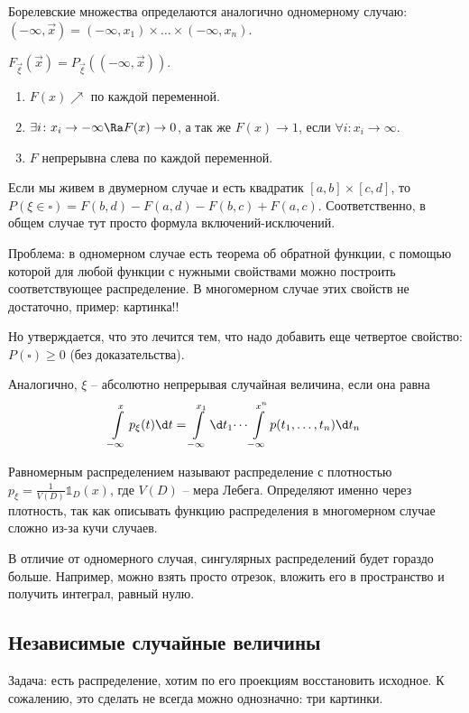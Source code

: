 Борелевские множества определаются аналогично одномерному случаю: $(-\infty, \vec{x}) = (-\infty, x_1) \times \dots \times (-\infty, x_n)$.

$F_{\vec{\xi}}(\vec{x}) = P_{\vec{\xi}}((-\infty, \vec{x}))$.

\begin{theorem}

\begin{enumerate}

\item $F(x) \nearrow$ по каждой переменной.
\item $\exists i\colon x_i \to -\infty \Ra F(x) \to 0$, а так же $F(x) \to 1$, если $\forall i\colon x_i \to \infty$.
\item $F$ непрерывна слева по каждой переменной.
\end{enumerate}
\end{theorem}

Если мы живем в двумерном случае и есть квадратик $[a, b] \times [c, d]$, то $P(\xi \in \square)= F(b, d) - F(a, d) - F(b, c) + F(a, c)$. 
Соответственно, в общем случае тут просто формула включений-исключений.

Проблема: в одномерном случае есть теорема об обратной функции, с помощью которой для любой функции с нужными свойствами можно построить соответствующее распределение.
В многомерном случае этих свойств не достаточно, пример: \TODO картинка!!

Но утверждается, что это лечится тем, что надо добавить еще четвертое свойство: $P(\square) \geq 0$ (без доказательства). 

Аналогично, $\xi$ -- абсолютно непрерывая случайная величина, если она равна 
$$\int\limits_{-\infty}^x p_{\xi}(t)\d t = \int\limits_{-\infty}^{x_1} \d t_1 \dots \int\limits_{-\infty}^{x^n} p(t_1, \dots, t_n) \d t_n$$

Равномерным распределением называют распределение с плотностью $p_{\xi} = \frac{1}{V(D)} \mathbb{1}_D(x)$, где $V(D)$ -- мера Лебега.
Определяют именно через плотность, так как описывать функцию распределения в многомерном случае сложно из-за кучи случаев.

В отличие от одномерного случая, сингулярных распределений будет гораздо больше. Например, можно взять просто отрезок, вложить его в пространство и получить интеграл, равный нулю.


\subsection{Независимые случайные величины}
Задача: есть распределение, хотим по его проекциям восстановить исходное. К сожалению, это сделать не всегда можно однозначно: \TODO три картинки.

